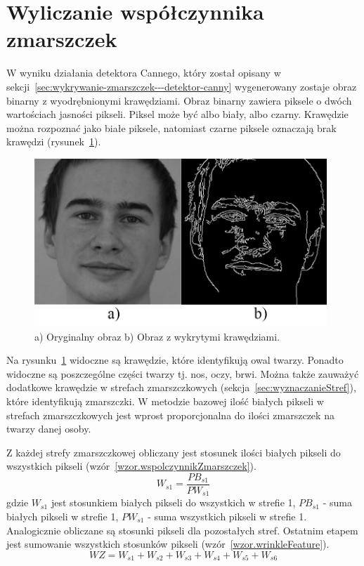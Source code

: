 \documentclass[a4paper,twoside,12pt]{book}
\begin{document}
    \section{Wyliczanie współczynnika zmarszczek}\label{sec:wyliczanieWrinkleFeature}
    W wyniku działania detektora Cannego, który został opisany w sekcji~\ref{sec:wykrywanie-zmarszczek---detektor-canny}
    wygenerowany zostaje obraz binarny z wyodrębnionymi krawędziami.
    Obraz binarny zawiera piksele o dwóch wartościach jasności pikseli.
    Piksel może być albo biały, albo czarny.
    Krawędzie można rozpoznać jako białe piksele, natomiast czarne piksele oznaczają brak krawędzi (rysunek~\ref{fig.mojaTwarzGray}).

    \begin{figure}[h!]
        \centering
        \includegraphics[width=11cm]{Obrazy/mojaTwarzGray.jpg}
        \caption{a) Oryginalny obraz b) Obraz z wykrytymi krawędziami.}
        \label{fig.mojaTwarzGray}
    \end{figure}

    Na rysunku~\ref{fig.mojaTwarzGray} widoczne są krawędzie, które identyfikują owal twarzy.
    Ponadto widoczne są poszczególne części twarzy tj. nos, oczy, brwi.
    Można także zauważyć dodatkowe krawędzie w strefach zmarszczkowych (sekcja~\ref{sec:wyznaczanieStref}),
    które identyfikują zmarszczki.
    W metodzie bazowej ilość białych pikseli w strefach zmarszczkowych jest wprost proporcjonalna do ilości zmarszczek
    na twarzy danej osoby.

    Z każdej strefy zmarszczkowej obliczany jest stosunek ilości białych pikseli do wszystkich
    pikseli (wzór~\ref{wzor.wspolczynnikZmarszczek}).
    \large
    \begin{equation}
        W_{s1} = \frac{PB_{s1}}{PW_{s1}}
        \label{wzor.wspolczynnikZmarszczek}
    \end{equation}
    \normalsize
    gdzie $W_{s1}$ jest stosunkiem białych pikseli do wszystkich w strefie 1,
    $PB_{s1}$ - suma białych pikseli w strefie 1, $PW_{s1}$ - suma wszystkich pikseli w strefie 1.
    Analogicznie obliczane są stosunki pikseli dla pozostałych stref.
    Ostatnim etapem jest sumowanie wszystkich stosunków pikseli (wzór~\ref{wzor.wrinkleFeature}).
    \large
    \begin{equation}
        WZ = W_{s1} + W_{s2} + W_{s3} + W_{s4} + W_{s5} + W_{s6}
        \label{wzor.wrinkleFeature}
    \end{equation}
    \normalsize
\end{document}
